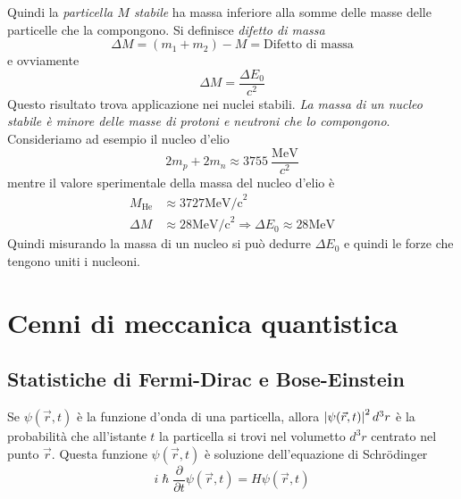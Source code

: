 Quindi la \textit{particella $M$ stabile} ha massa inferiore alla somme delle
masse delle particelle che la compongono. Si definisce \textit{difetto di massa}
\begin{equation}
 \Delta M = (m_1 + m_2) - M = \text{Difetto di massa}
\end{equation}
e ovviamente
\begin{equation}
\Delta M = \frac{\Delta E_0}{c^2}
\end{equation}
Questo risultato trova applicazione nei nuclei stabili. \textit{La massa di un
nucleo stabile è minore delle masse di protoni e neutroni che lo compongono}.
Consideriamo ad esempio il nucleo d'elio
\[
  2m_p + 2m_n \approx 3755 \ \dfrac{\text{MeV}}{c^2}
\]
mentre il valore sperimentale della massa del nucleo d'elio è
\begin{align*}
M_\text{He} &\approx 3727\text{MeV/c}^2\\
\Delta M &\approx 28\text{MeV/c}^2 \Rightarrow \Delta E_0 \approx 28\text{MeV}
\end{align*}
Quindi misurando la massa di un nucleo si può dedurre $\Delta E_0$ e quindi le 
forze che tengono uniti i nucleoni.

\chapter{Cenni di meccanica quantistica}

\section{Statistiche di Fermi-Dirac e Bose-Einstein}

Se $\psi(\vec{r},t)$ è la funzione d'onda di una particella, allora
$\left| \psi(\vec{r},t) \right|^2d^3r$ è la probabilità che all'istante $t$ la 
particella
si trovi nel volumetto $d^3r$ centrato nel punto $\vec{r}$. Questa funzione
$\psi(\vec{r},t)$ è soluzione dell'equazione di Schr\"odinger
\begin{equation}
 i\hslash \frac{\partial}{\partial t}\psi(\vec{r},t) = H \psi(\vec{r},t)
\end{equation}

